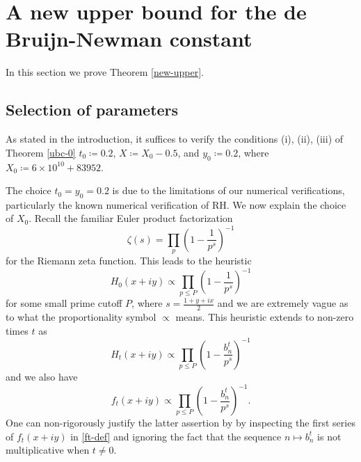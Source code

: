\section{A new upper bound for the de Bruijn-Newman constant}\label{newup-sec}

In this section we prove Theorem \ref{new-upper}. 

\subsection{Selection of parameters}\label{select}

As stated in the introduction, it suffices to verify the conditions (i), (ii), (iii) of Theorem \ref{ubc-0} $t_0 \coloneqq 0.2$, $X \coloneqq X_0-0.5$, and $y_0 \coloneqq 0.2$, where $X_0 \coloneqq 6 \times 10^{10} + 83952$.  

The choice $t_0=y_0=0.2$ is due to the limitations of our numerical verifications, particularly the known numerical verification of RH.  We now explain the choice of $X_0$.  Recall the familiar Euler product factorization
$$ \zeta(s) = \prod_p \left(1 - \frac{1}{p^s}\right)^{-1}$$
for the Riemann zeta function.  This leads to the heuristic
$$ H_0(x+iy) \propto \prod_{p \leq P} \left(1 - \frac{1}{p^s}\right)^{-1}$$
for some small prime cutoff $P$, where $s = \frac{1+y+ix}{2}$ and we are extremely vague as to what the proportionality symbol $\propto$ means.  This heuristic extends to non-zero times $t$ as
$$ H_t(x+iy) \propto \prod_{p \leq P} \left(1 - \frac{b_n^t}{p^s}\right)^{-1}$$
and we also have
\begin{equation}\label{oscil}
 f_t(x+iy) \propto \prod_{p \leq P} \left(1 - \frac{b_n^t}{p^s}\right)^{-1}.
\end{equation}
One can non-rigorously justify the latter assertion by by inspecting the first series of $f_t(x+iy)$ in \eqref{ft-def} and ignoring the fact that the sequence $n \mapsto b_n^t$ is not multiplicative when $t \neq 0$.  

